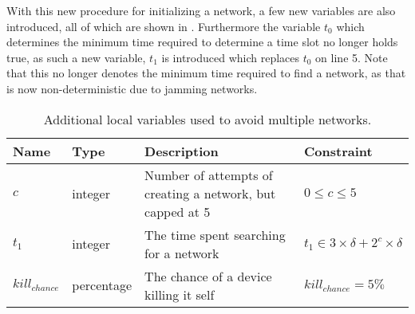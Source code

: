\bigskip \noindent
With this new procedure for initializing a network, a few new variables are also introduced, all of which are shown in .
Furthermore the variable $t_0$ which determines the minimum time required to determine a time slot no longer holds true, as such a new variable, $t_1$ is introduced which replaces $t_0$ on  line 5.
Note that this no longer denotes the minimum time required to find a network, as that is now non-deterministic due to jamming networks.
\begin{table}[h]
    {\setlength{\extrarowheight}{1ex}%
    \begin{tabularx}{\textwidth}{l|l|X|l}
        \toprule
        Name                & Type       & Description & Constraint \\
        \midrule
        $c$                 & integer    & Number of attempts of creating a network, but capped at 5                         & $0 \leq c \leq 5$     \\
        $t_1$               & integer    & The time spent searching for a network                                            & $t_1 \in 3 \times \delta + 2^c \times \delta$     \\
        $kill_{chance}$     & percentage & The chance of a device killing it self                                            & $kill_{chance} = 5\%$  \\
        \bottomrule
    \end{tabularx}}
    \caption{Additional local variables used to avoid multiple networks.}
    \label{tab:locals_wmultistartup}
\end{table}
